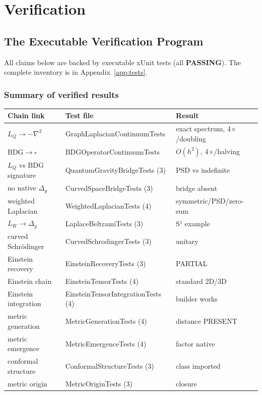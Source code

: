 \documentclass[11pt,twoside]{book}
\begin{document}
\part{Verification}

\chapter{The Executable Verification Program}
\label{ch:verification}

All claims below are backed by executable xUnit tests (all \textbf{PASSING}). The complete
inventory is in Appendix~\ref{app:tests}.

\section{Summary of verified results}

\begin{center}
\begin{tabular}{lll}
\toprule
Chain link & Test file & Result \\
\midrule
$L_Q\to-\nabla^2$ & GraphLaplacianContinuumTests & exact spectrum, 4$\times$/doubling \\
BDG$\to\square$ & BDGOperatorContinuumTests & $O(h^2)$, 4$\times$/halving \\
$L_Q$ vs BDG signature & QuantumGravityBridgeTests (3) & PSD vs indefinite \\
no native $\Delta_g$ & CurvedSpaceBridgeTests (3) & bridge absent \\
weighted Laplacian & WeightedLaplacianTests (4) & symmetric/PSD/zero-sum \\
$L_W\to\Delta_g$ & LaplaceBeltramiTests (3) & S¹ example \\
curved Schr\"odinger & CurvedSchrodingerTests (3) & unitary \\
Einstein recovery & EinsteinRecoveryTests (3) & PARTIAL \\
Einstein chain & EinsteinTensorTests (4) & standard 2D/3D \\
Einstein integration & EinsteinTensorIntegrationTests (4) & builder works \\
metric generation & MetricGenerationTests (4) & distance PRESENT \\
metric emergence & MetricEmergenceTests (4) & factor native \\
conformal structure & ConformalStructureTests (3) & class imported \\
metric origin & MetricOriginTests (3) & closure \\
\bottomrule
\end{tabular}
\end{center}
\end{document}
